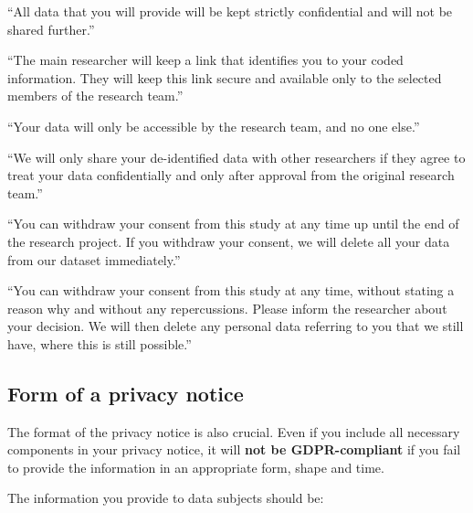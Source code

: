 \documentclass[
]{book}
\begin{document}
``All data that you will provide will be kept strictly confidential and will not be shared further.''

``The main researcher will keep a link that identifies you to your coded information. They will keep this link secure and available only to the selected members of the research team.''

``Your data will only be accessible by the research team, and no one else.''

``We will only share your de-identified data with other researchers if they agree to treat your data confidentially and only after approval from the original research team.''

``You can withdraw your consent from this study at any time up until the end of the research project. If you withdraw your consent, we will delete all your data from our dataset immediately.''

``You can withdraw your consent from this study at any time, without stating a reason why and without any repercussions. Please inform the researcher about your decision. We will then delete any personal data referring to you that we still have, where this is still possible.''

\hypertarget{form-of-a-privacy-notice}{%
\subsection{Form of a privacy notice}\label{form-of-a-privacy-notice}}

The format of the privacy notice is also crucial. Even if you include all
necessary components in your privacy notice, it will \textbf{not be GDPR-compliant}
if you fail to provide the information in an appropriate form, shape and time.

The information you provide to data subjects should be:
\end{document}
